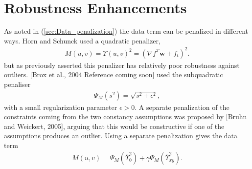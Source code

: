 \section{Robustness Enhancements}
As noted in (\ref{sec:Data_penalization}) the data term can be penalized in different ways. Horn and Schunck \cite{HS} used a quadratic penalizer,
\begin{align}
M(u,v) = \Upsilon(u,v) ^2 = (\nabla f ^T \textbf{w}+ f_t)^2.
\end{align}
but as previously asserted this penalizer has relatively poor robustness against outliers. [Brox et al., 2004 Reference coming soon] used the subquadratic penaliser
\begin{align*}
\Psi_M(s^2) = \sqrt{s^2 + \epsilon^2},
\end{align*} 
with a small regularization parameter $\epsilon > 0$. A separate penalization of the constraints coming from the two constancy assumptions was proposed by [Bruhn and Weickert, 2005], arguing that this would be constructive if one of the assumptions produces an outlier. Using a separate penalization gives the data term
\begin{align}
\label{sep_pen}
M(u,v) = \Psi_M(\bar{\Upsilon}_0^2) + \gamma \Psi_M(\bar{\Upsilon}_{xy}^2).
\end{align}